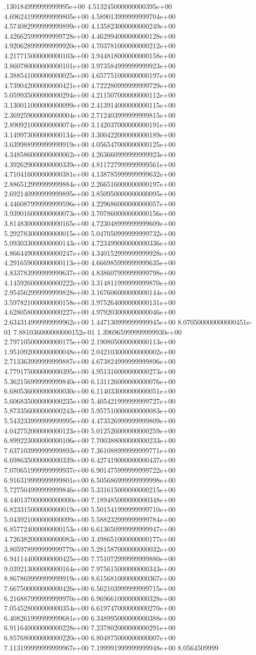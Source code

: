 .130184999999999995e+00	4.513245000000000395e+00	4.696241999999999805e+00	4.589013999999999704e+00	4.574082999999999899e+00	4.135823000000000249e+00	4.426625999999999728e+00	4.462994000000000128e+00	4.920628999999999920e+00	4.703781000000000212e+00	4.217715000000000103e+00	3.944818000000000158e+00	3.860780000000000101e+00	3.973584999999999923e+00	4.388541000000000025e+00	4.657751000000000197e+00	4.739042000000000421e+00	4.722280999999999729e+00	5.059935000000000294e+00	4.211507000000000112e+00	3.130011000000000099e+00	2.413914000000000115e+00	2.369259000000000004e+00	2.712403999999999815e+00	2.890921000000000074e+00	3.142037000000000191e+00	3.149973000000000134e+00	3.300422000000000189e+00	3.639988999999999919e+00	4.056547000000000125e+00	4.348586000000000062e+00	4.263660999999999923e+00	4.392629000000000339e+00	4.811727999999999561e+00	4.710416000000000381e+00	4.138785999999999632e+00	2.886512999999999884e+00	2.266516000000000197e+00	2.692140999999999895e+00	3.850950000000000095e+00	4.446087999999999596e+00	4.229686000000000057e+00	3.939016000000000073e+00	3.707860000000000156e+00	3.814830000000000165e+00	4.723048999999999609e+00	5.292783000000000015e+00	5.047050999999999732e+00	5.093033000000000143e+00	4.723499000000000336e+00	4.866449000000000247e+00	4.340152999999999928e+00	4.291659000000000113e+00	4.666985999999999635e+00	4.833783999999999637e+00	4.838607999999999798e+00	4.145926000000000222e+00	3.314811999999999870e+00	2.954562999999999828e+00	3.167606000000000144e+00	3.597821000000000158e+00	3.975264000000000131e+00	4.628058000000000227e+00	4.979203000000000046e+00	2.634314999999999962e+00	1.447130999999999945e+00	8.070500000000000451e-01	7.881036000000000152e-01	1.396965999999999930e+00	2.797105000000000175e+00	2.190805000000000113e+00	1.951092000000000048e+00	2.042103000000000002e+00	2.713363999999999887e+00	4.673824999999999896e+00	4.779175000000000395e+00	4.951316000000000273e+00	5.362156999999999840e+00	6.131126000000000076e+00	6.680536000000000030e+00	6.114033000000000051e+00	5.606835000000000235e+00	5.405421999999999727e+00	5.873356000000000243e+00	5.957510000000000083e+00	5.543233999999999995e+00	4.473526999999999809e+00	4.042752000000000123e+00	5.012526000000000259e+00	6.899223000000000106e+00	7.700388000000000233e+00	7.637103999999999893e+00	7.361088999999999771e+00	6.698635000000000339e+00	6.427419000000000437e+00	7.070651999999999937e+00	6.901475999999999722e+00	6.916319999999999801e+00	6.505686999999999998e+00	5.727504999999999846e+00	5.331615000000000215e+00	6.440137000000000000e+00	7.189485000000000348e+00	6.823315000000000019e+00	5.501541999999999710e+00	5.043921000000000099e+00	5.588232999999999784e+00	6.857724000000000153e+00	6.613650999999999947e+00	4.726382000000000083e+00	3.498651000000000177e+00	3.805978999999999779e+00	5.281587000000000032e+00	6.941144000000000425e+00	7.751072999999999880e+00	9.039213000000000164e+00	7.975615000000000343e+00	8.867869999999999919e+00	8.615681000000000367e+00	7.667500000000000426e+00	6.562103999999999715e+00	6.216887999999999970e+00	6.969661000000000328e+00	7.054528000000000354e+00	6.619747000000000270e+00	6.408261999999999681e+00	6.348995000000000388e+00	6.911640000000000228e+00	7.237802000000000291e+00	6.857680000000000220e+00	6.804875000000000007e+00	7.113199999999999967e+00	7.199991999999999948e+00	8.0564509999